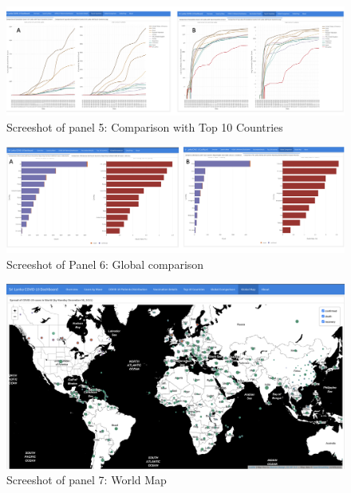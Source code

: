 \documentclass[
]{article}
\begin{document}
\begin{figure}

{\centering \includegraphics[width=0.8\linewidth]{Images/image5} 

}

\caption{Screeshot of panel 5: Comparison with Top 10 Countries}\label{fig:unnamed-chunk-9}
\end{figure}

\begin{figure}

{\centering \includegraphics[width=0.8\linewidth]{Images/image6} 

}

\caption{Screeshot of Panel 6: Global comparison}\label{fig:unnamed-chunk-10}
\end{figure}

\begin{figure}

{\centering \includegraphics[width=0.8\linewidth]{Images/image7} 

}

\caption{Screeshot of panel 7: World Map}\label{fig:unnamed-chunk-11}
\end{figure}
\end{document}

